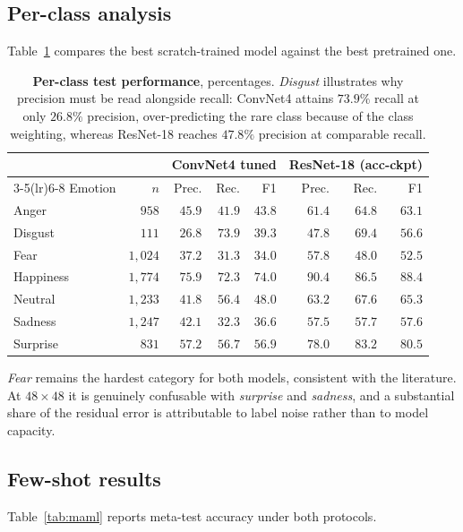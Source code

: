 \documentclass[11pt,a4paper]{article}
\begin{document}
\subsection{Per-class analysis}
Table~\ref{tab:perclass} compares the best scratch-trained model against the
best pretrained one.

\begin{table}[htbp]
\centering
\small
\begin{tabular}{lrrrrrrr}
\toprule
& & \multicolumn{3}{c}{ConvNet4 tuned} & \multicolumn{3}{c}{ResNet-18 (acc-ckpt)}\\
\cmidrule(lr){3-5}\cmidrule(lr){6-8}
Emotion & $n$ & Prec. & Rec. & F1 & Prec. & Rec. & F1 \\
\midrule
Anger     & $958$     & $45.9$ & $41.9$ & $43.8$ & $61.4$ & $64.8$ & $63.1$ \\
Disgust   & $111$     & $26.8$ & $73.9$ & $39.3$ & $47.8$ & $69.4$ & $56.6$ \\
Fear      & $1{,}024$ & $37.2$ & $31.3$ & $34.0$ & $57.8$ & $48.0$ & $52.5$ \\
Happiness & $1{,}774$ & $75.9$ & $72.3$ & $74.0$ & $90.4$ & $86.5$ & $88.4$ \\
Neutral   & $1{,}233$ & $41.8$ & $56.4$ & $48.0$ & $63.2$ & $67.6$ & $65.3$ \\
Sadness   & $1{,}247$ & $42.1$ & $32.3$ & $36.6$ & $57.5$ & $57.7$ & $57.6$ \\
Surprise  & $831$     & $57.2$ & $56.7$ & $56.9$ & $78.0$ & $83.2$ & $80.5$ \\
\bottomrule
\end{tabular}
\caption{\textbf{Per-class test performance}, percentages. \emph{Disgust}
illustrates why precision must be read alongside recall: ConvNet4 attains
$73.9\%$ recall at only $26.8\%$ precision, over-predicting the rare class
because of the class weighting, whereas ResNet-18 reaches $47.8\%$ precision at
comparable recall.}
\label{tab:perclass}
\end{table}

\emph{Fear} remains the hardest category for both models, consistent with the
literature. At $48\times48$ it is genuinely confusable with \emph{surprise} and
\emph{sadness}, and a substantial share of the residual error is attributable
to label noise rather than to model capacity.

\subsection{Few-shot results}
Table~\ref{tab:maml} reports meta-test accuracy under both protocols.
\end{document}

